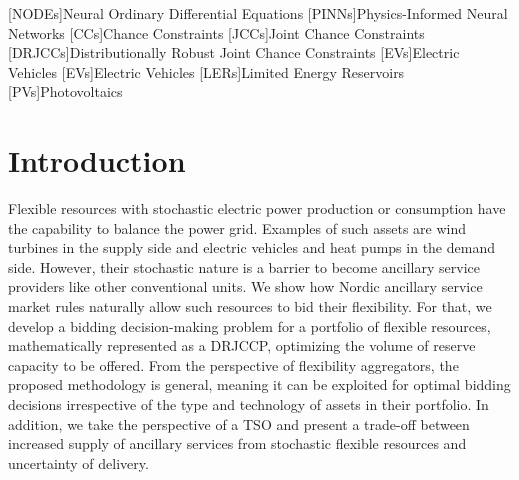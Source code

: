\documentclass[conference]{IEEEtran}
\begin{document}
\begin{acronym}[DRJCCP]
    [NODEs]{Neural Ordinary Differential Equations}
    [PINNs]{Physics-Informed Neural Networks}
    [CCs]{Chance Constraints}
    [JCCs]{Joint Chance Constraints}
    [DRJCCs]{Distributionally Robust Joint Chance Constraints}
    [EVs]{Electric Vehicles}
    [EVs]{Electric Vehicles}
    [LERs]{Limited Energy Reservoirs}
    [PVs]{Photovoltaics}
\end{acronym}


\vspace{2mm}
\section{Introduction}\label{sec:Introduction}
\vspace{-1mm}



Flexible resources with stochastic electric power production or consumption have the capability to balance the power grid. Examples of such assets are  wind turbines in the supply side and electric vehicles and heat pumps in the demand side. However, their stochastic nature is a barrier to become ancillary service providers like other conventional units. We show how Nordic ancillary service market rules naturally allow such  resources to bid their flexibility. For that, we develop a bidding decision-making problem for a portfolio of flexible resources, mathematically represented as a  \ac{DRJCCP}, optimizing the volume of reserve capacity to be offered. From the  perspective of flexibility aggregators, the proposed methodology is general, meaning it can be exploited for optimal bidding decisions irrespective of the type and technology of  assets in their portfolio. %
In addition, we take the perspective of a \ac{TSO} and present a trade-off between increased  supply of ancillary services from stochastic flexible resources and uncertainty of delivery. 
\end{document}
